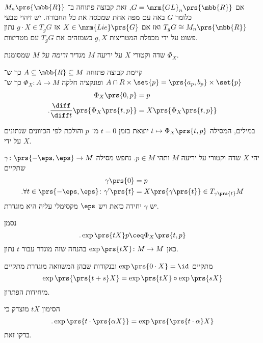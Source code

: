 \documentclass[10pt, twoside]{book}
\newcommand{\Lie}{\mrm{Lie}}
\begin{document}
\begin{example}
אם
$G = \mrm{GL}_n\prs{\mbb{R}}$,
זאת קבוצה פתוחה ב־%
$M_n\prs{\mbb{R}}$
כלומר
$G$
באה עם מפה אחת שמכסה את כל החבורה.
יש זיהוי טבעי
$T_g G \cong M_n\prs{\mbb{R}}$
ואז אם
$X \in \Lie\prs{G}$
אז
$g \cdot X \in T_g G$
נתון פשוט על ידי מכפלת המטריצות
$g,X$
כשמזהים את
$T_g G$
עם מטריצות.
\end{example}

\begin{definition}
שדה וקטורי
$X$
על יריעה
$M$
מגדיר
\emph{זרימה על
$M$}
שמסומנת
$\Phi_X$.

קיימת קבוצה פתוחה
$A \subseteq \mbb{R} \subseteq M$
כך ש־%
$A \cap R \times \set{p} = \prs{a_p, b_p} \times \set{p}$
ופונקציה חלקה
$\Phi_X \colon A \to M$
כך ש־%
\begin{align*}
\Phi_X\prs{0,p} &= p \\
\text{.} \frac{\diff}{\diff t} \prs{\Phi_X\prs{t,p}} &= X\prs{\Phi_X\prs{t,p}}
\end{align*}

במילים, המסילה
$t \mapsto \Phi_X\prs{t,p}$
יוצאת בזמן
$t=0$
מ־%
$p$
והולכת לפי הכיוונים שנתונים על ידי
$X$.
\end{definition}

\begin{theorem}
יהי
$X$
שדה וקטורי על יריעה
$M$
ותהי
$p \in M$.
נחפש מסילה
$\gamma \colon \prs{-\eps, \eps} \to M$
שתקיים
\begin{align*}
\gamma\prs{0} &= p \\
\text{.} \forall t \in \prs{-\eps, \eps} \colon \gamma'\prs{t} &= X\prs{\gamma\prs{t}} \in T_{\gamma\prs{t}} M
\end{align*}
יש
$\gamma$
יחידה כזאת ויש
$\eps$
מקסימלי עליה היא מוגדרת.
\end{theorem}

\begin{definition}[אקספוננט]
נסמן
\[\text{.} \exp\prs{tX} p \ceq \Phi_X\prs{t,p}\]
כאן
$\exp\prs{tX} \colon M \to M$
בהנחה שזה מוגדר עבור
$t$
נתון.
\end{definition}

\begin{remark}
מתקיים
$\exp\prs{0 \cdot X} = \id$
ובנקודות שבהן המשוואה מוגדרת מתקיים
\[\exp\prs{\prs{t+s} X} = \exp\prs{tX} \circ \exp\prs{sX}\]
מיחידות הפתרון.
\end{remark}

\begin{remark}
הסימון
$tX$
מוצדק כי
\[\text{.} \exp\prs{t \cdot \prs{\alpha X}} = \exp\prs{\prs{t \cdot \alpha} X}\]
בדקו זאת.
\end{remark}
\end{document}
